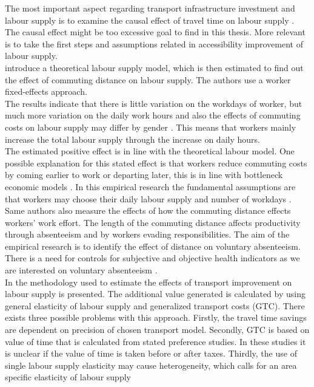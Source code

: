 The most important aspect regarding transport infrastructure investment and labour supply is to examine the causal effect of travel time on labour supply \citep{andersson}. The causal effect might be too excessive goal to find in this thesis. More relevant is to take the first steps and assumptions related in accessibility improvement of labour supply. \\

\cite{guti} introduce a theoretical labour supply model, which is then estimated to find out the effect of commuting distance on labour supply. The authors use a worker fixed-effects approach. \\

The results indicate that there is little variation on the workdays of worker, but much more variation on the daily work hours and also the effects of commuting costs on labour supply may differ by gender \citep{guti}. This means that workers mainly increase the total labour supply through the increase on daily hours. \\

The estimated positive effect is in line with the theoretical labour model. One possible explanation for this stated effect is that workers reduce commuting costs by coming earlier to work or departing later, this is in line with bottleneck economic models \citep{guti}. In this empirical research the fundamental assumptions are that workers may choose their daily labour supply and number of workdays \citep{guti}.   \\

Same authors also measure the effects of how the commuting distance effects workers' work effort. The length of the commuting distance affects productivity through absenteeism and by workers evading responsibilities. The aim of the empirical research is to identify the effect of distance on voluntary absenteeism. There is a need for controls for subjective and objective health indicators as we are interested on voluntary absenteeism \citep{van}. \\

In \cite{andersson} the methodology used to estimate the effects of transport improvement on labour supply is presented. The additional value generated is calculated by using general elasticity of labour supply and generalized transport costs (GTC). There exists three possible problems with this approach. Firstly, the travel time savings are dependent on precision of chosen transport model. Secondly, GTC is based on value of time that is calculated from stated preference studies. In these studies it is unclear if the value of time is taken before or after taxes. Thirdly, the use of single labour supply elasticity may cause heterogeneity, which calls for an area specific elasticity of labour supply \citep{andersson} \\


